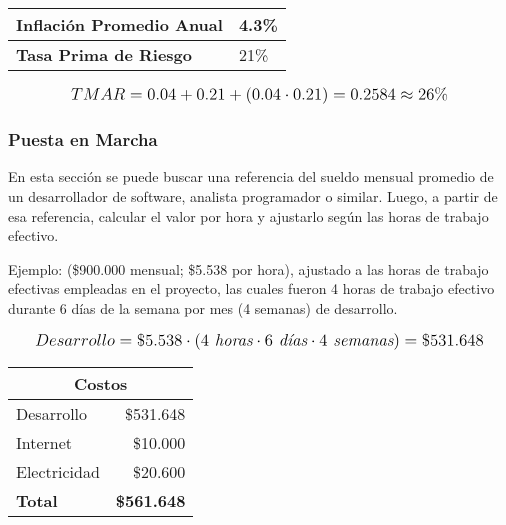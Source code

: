 \begin{center}
	\begin{tabular}{ | p{7cm} | p{5cm}|}
		\hline
		{\textbf{Inflación Promedio Anual}} & 4.3\%  \\ \hline
		{\textbf{Tasa Prima de Riesgo}} & 21\% \\ \hline
	\end{tabular}

  \label{table:indicators}
\end{center}

\[
\mathlarger{
  TMAR = 0.04+0.21+(0.04\cdot0.21) = 0.2584 \approx 26\%
}
\]

\subsubsection{Puesta en Marcha}
En esta sección se puede buscar una referencia del sueldo mensual promedio de un desarrollador de software, analista programador o similar. Luego, a partir de esa referencia, calcular el valor por hora y ajustarlo según las horas de trabajo efectivo.


Ejemplo: (\$900.000 mensual; \$5.538 por hora), ajustado a las horas de trabajo efectivas empleadas en el proyecto, las cuales fueron 4 horas de trabajo efectivo durante 6 días de la semana por mes (4 semanas) de desarrollo.

\[
\mathlarger{
	Desarrollo = \$5.538 \cdot \left(4 \textit{ horas}\cdot6 \textit{ días}\cdot4 \textit{ semanas}\right) = \$531.648
}
\]

\begin{center}
	\begin{tabular}{ | p{5cm} | p{5cm} | }
		\hline
    \multicolumn{2}{|c|}{\textbf{Costos}} \\
		\hline
		{Desarrollo} & \multicolumn{1}{|r|}{\$531.648} \\ \hline
		
		{Internet} & \multicolumn{1}{|r|}{\$10.000} \\ \hline
		
		{Electricidad} & \multicolumn{1}{|r|}{\$20.600} \\ \hline
    
    {\textbf{Total}} & \multicolumn{1}{|r|}{\textbf{\$561.648}} \\ \hline
	\end{tabular}

  \label{table:costs}
\end{center}

